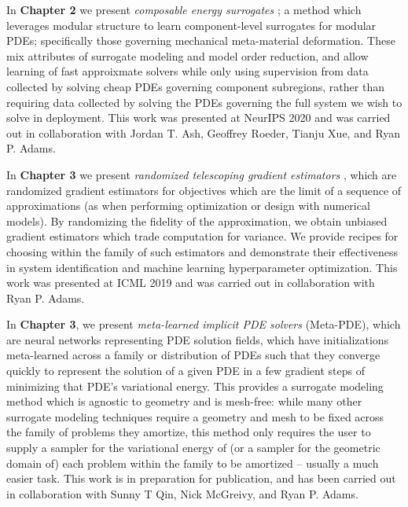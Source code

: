 \documentclass{puthesis}
\begin{document}
In \textbf{Chapter 2} we present \emph{composable energy surrogates} \citep{beatson2020learning};
a method which leverages
modular structure to learn component-level surrogates for modular PDEs; specifically
those governing mechanical meta-material deformation.
These mix attributes of surrogate modeling and model order reduction, and allow
learning of fast approixmate solvers while only using supervision from data collected
by solving cheap PDEs governing component subregions, rather than requiring data
collected by solving the PDEs governing the full system we wish to solve in deployment.
This work was presented at NeurIPS 2020 and was carried out in collaboration with
Jordan T. Ash, Geoffrey Roeder, Tianju Xue, and Ryan P. Adams.

In \textbf{Chapter 3} we present \emph{randomized telescoping gradient estimators} \citep{beatson2019efficient}, which are
randomized gradient estimators for objectives which are the limit of a sequence of
approximations (as when performing optimization or design with numerical models).
By randomizing the fidelity of the approximation, we obtain unbiased gradient estimators
which trade computation for variance.
We provide recipes for choosing within the family of such estimators and demonstrate
their effectiveness in system identification and machine learning hyperparameter
optimization.
This work was presented at ICML 2019
and was carried out in collaboration with Ryan P. Adams.

In \textbf{Chapter 3},
we present \emph{meta-learned implicit PDE solvers} (Meta-PDE), which are neural networks
representing PDE solution fields, which have initializations meta-learned across a
family or distribution of PDEs such that they converge quickly to represent the solution
of a given PDE in a few gradient steps of minimizing that PDE's variational energy.
This provides a surrogate modeling method which is agnostic to geometry and is mesh-free:
while many other surrogate modeling techniques require a geometry and mesh to be fixed
across the family of problems they amortize, this method only requires the user to
supply a sampler for the variational energy of (or a sampler for the geometric domain of)
each problem within the family to be amortized -- usually a much easier task.
This work is in preparation for publication, and has been
carried out in collaboration with Sunny T Qin, Nick McGreivy, and Ryan P. Adams.
\end{document}

